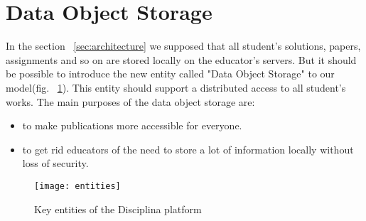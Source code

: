 \appendix
\section{Data Object Storage}

In the section ~\ref{sec:architecture} we supposed that all student's solutions, papers, assignments and so on are stored locally on the educator's servers. But it should be possible to introduce the new entity called "Data Object Storage" to our model(fig. ~\ref{fig:entities}). This entity should support a distributed access to all student's works. The main purposes of the data object storage are:
\begin{itemize}
\item to make publications more accessible for everyone.
\item to get rid educators of the need to store a lot of information locally without loss of security.
\end{itemize}

\begin{figure}[ht]
\centering
\texttt{[image: entities]}
\caption{Key entities of the Disciplina platform}
\label{fig:entities}
\end{figure}

